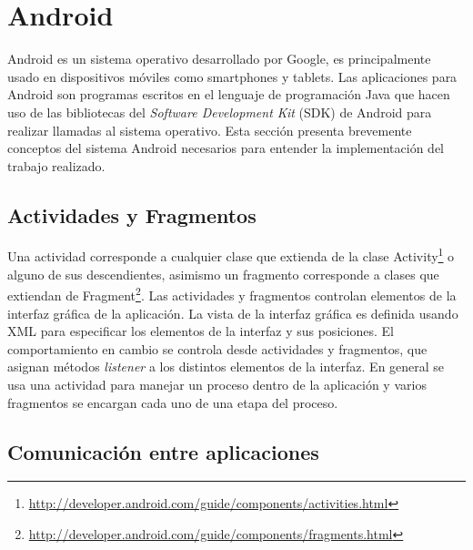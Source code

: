 \section{Android}\label{android}
Android es un sistema operativo desarrollado por Google, es principalmente usado en dispositivos móviles como smartphones y tablets. Las aplicaciones para Android son programas escritos en el lenguaje de programación Java que hacen uso de las bibliotecas del \emph{Software Development Kit} (SDK) de Android para realizar llamadas al sistema operativo. Esta sección presenta brevemente conceptos del sistema Android necesarios para entender la implementación del trabajo realizado.

\subsection*{Actividades y Fragmentos}

Una actividad corresponde a cualquier clase que extienda de la clase Activity\footnote{\url{http://developer.android.com/guide/components/activities.html}} o alguno de sus descendientes, asimismo un fragmento corresponde a clases que extiendan de Fragment\footnote{\url{http://developer.android.com/guide/components/fragments.html}}. Las actividades y fragmentos controlan elementos de la interfaz gráfica de la aplicación. La vista de la interfaz gráfica es definida usando XML para especificar los elementos de la interfaz y sus posiciones. El comportamiento en cambio se controla desde actividades y fragmentos, que asignan métodos \emph{listener} a los distintos elementos de la interfaz. 
En general se usa una actividad para manejar un proceso dentro de la aplicación y varios fragmentos se encargan cada uno de una etapa del proceso.

\subsection*{Comunicación entre aplicaciones}

